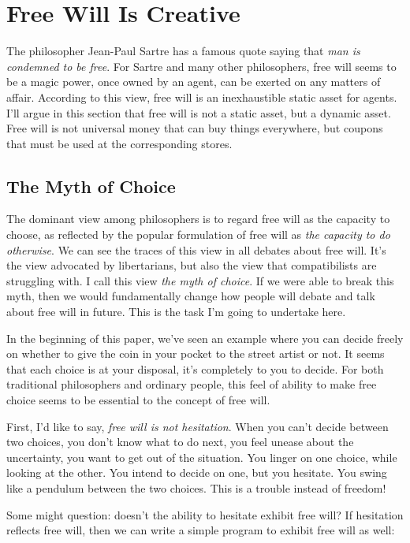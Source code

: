 \section{Free Will Is Creative}

The philosopher Jean-Paul Sartre has a famous quote saying that \emph{man is condemned to be free}. For Sartre and many other philosophers, free will seems to be a magic power, once owned by an agent, can be exerted on any matters of affair. According to this view, free will is an inexhaustible static asset for agents. I'll argue in this section that free will is not a static asset, but a dynamic asset. Free will is not universal money that can buy things everywhere, but coupons that must be used at the corresponding stores.

\subsection{The Myth of Choice}

The dominant view among philosophers is to regard free will as the capacity to choose, as reflected by the popular formulation of free will as \emph{the capacity to do otherwise}. We can see the traces of this view in all debates about free will. It's the view advocated by libertarians, but also the view that compatibilists are struggling with. I call this view \emph{the myth of choice}. If we were able to break this myth, then we would fundamentally change how people will debate and talk about free will in future. This is the task I'm going to undertake here.

In the beginning of this paper, we've seen an example where you can decide freely on whether to give the coin in your pocket to the street artist or not. It seems that each choice is at your disposal, it's completely to you to decide. For both traditional philosophers and ordinary people, this feel of ability to make free choice seems to be essential to the concept of free will.

First, I'd like to say, \emph{free will is not hesitation}. When you can't decide between two choices, you don't know what to do next, you feel unease about the uncertainty, you want to get out of the situation. You linger on one choice, while looking at the other. You intend to decide on one, but you hesitate. You swing like a pendulum between the two choices. This is a trouble instead of freedom!

Some might question: doesn't the ability to hesitate exhibit free will? If hesitation reflects free will, then we can write a simple program to exhibit free will as well:

